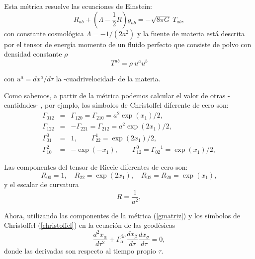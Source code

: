\documentclass[11pt]{book}
\begin{document}
Esta métrica resuelve las ecuaciones de Einstein:
\begin{equation}
R_{ab}+(\Lambda - \frac{1}{2}R)g_{ab}=-\sqrt{8\pi G}~T_{ab},
\label{eqe}
\end{equation}
con constante cosmológica $\Lambda=-1/(2a^2)$ y la fuente de materia está descrita por el tensor de energía momento de un fluido perfecto que consiste de polvo con densidad constante $\rho$
\begin{equation}
T^{ab}=\rho~ u^a u^b
\end{equation}

con $u^a=dx^a/d\tau$ la -cuadrivelocidad- de la materia.

Como sabemos, a partir de la métrica podemos calcular el valor de otras -cantidades-%
, por ejmplo, %
 los símbolos de Christoffel diferente de cero son:
\begin{eqnarray}
 \Gamma_{012}&=&\Gamma_{120}=\Gamma_{210}= a^2 \exp(x_1)/2, \nonumber
 \\
\Gamma_{122}&=&-\Gamma_{221}=\Gamma_{212}= a^2 \exp(2x_1)/2, \nonumber
\\
\Gamma_{01}^{0} &=& 1, \qquad \Gamma_{22}^{1} = \exp(2x_1)/2, \nonumber
\\
\Gamma_{10}^{2} &=& -\exp(-x_1), \qquad
\Gamma_{12}^{0} = {\Gamma_{02}}^{1} = \exp(x_1)/2, \nonumber
\label{christoffel}
\end{eqnarray}

Las componentes del tensor de Riccie diferentes de cero son:
\begin{equation}\label{ricci}
R_{00}=1, \quad R_{22}= \exp(2x_1),\quad R_{02}=R_{20}=\exp(x_1),
\label{ricci}
\end{equation}
y el escalar de curvatura
\begin{equation}
R=\frac{1}{a^2},
\label{R}
\end{equation}

Ahora, utilizando las componentes de la métrica (\ref{gmatriz}) y los símbolos de Christoffel (\ref{christoffel}) en la ecuación de las geodésicas
\begin{equation}
\frac {d^2 x_{\alpha}}{d\tau^2} + \Gamma_{\alpha}^{\beta\sigma} \frac{dx_\beta}{d\tau} \frac{dx_\sigma}{d\tau} = 0,
\label{geodesicas}
\end{equation}
donde las derivadas son respecto al tiempo propio $\tau$.
\end{document}
